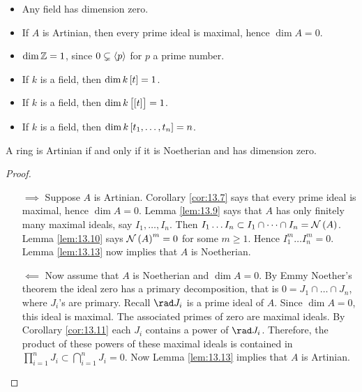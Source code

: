 \begin{example*}
\hfill
\begin{itemize}
\item Any field has dimension zero.
\item If $ A $ is Artinian, then every prime ideal is maximal, hence $ \dim A = 0 $.
\item $ \dim \mathbb{Z} = 1 $, since $ 0 \subsetneq \left\langle p \right\rangle $ for $ p $ a prime number.
\item If $ k $ is a field, then $ \dim k\sbr{t} = 1 $.
\item If $ k $ is a field, then $ \dim k\sbr{\sbr{t}} = 1 $.
\item If $ k $ is a field, then $ \dim k\sbr{t_1, \dots, t_n} = n $.
\end{itemize}
\end{example*}

\begin{theorem}
\label{thm:13.15}
A ring is Artinian if and only if it is Noetherian and has dimension zero.
\end{theorem}

\begin{proof}
\hfill
\begin{itemize}
\item[$ \implies $] Suppose $ A $ is Artinian. Corollary \ref{cor:13.7} says that every prime ideal is maximal, hence $ \dim A = 0 $. Lemma \ref{lem:13.9} says that $ A $ has only finitely many maximal ideals, say $ I_1, \dots, I_n $. Then $ I_1 \dots I_n \subset I_1 \cap \dots \cap I_n = \NNN\br{A} $. Lemma \ref{lem:13.10} says $ \NNN\br{A}^m = 0 $ for some $ m \ge 1 $. Hence $ I_1^m \dots I_n^m = 0 $. Lemma \ref{lem:13.13} now implies that $ A $ is Noetherian.
\item[$ \impliedby $] Now assume that $ A $ is Noetherian and $ \dim A = 0 $. By Emmy Noether's theorem the ideal zero has a primary decomposition, that is $ 0 = J_1 \cap \dots \cap J_n $, where $ J_i $'s are primary. Recall $ \rad J_i $ is a prime ideal of $ A $. Since $ \dim A = 0 $, this ideal is maximal. The associated primes of zero are maximal ideals. By Corollary \ref{cor:13.11} each $ J_i $ contains a power of $ \rad J_i $. Therefore, the product of these powers of these maximal ideals is contained in $ \prod_{i = 1}^n J_i \subset \bigcap_{i = 1}^n J_i = 0 $. Now Lemma \ref{lem:13.13} implies that $ A $ is Artinian.
\end{itemize}
\end{proof}

\pagebreak

